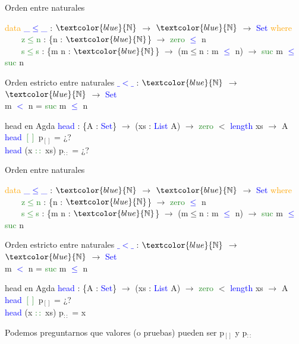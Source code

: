 \documentclass[xcolor=dvipsnames]{beamer} %
\newcommand{\cf}[1]{\textcolor{blue}{#1}}
\newcommand{\ct}[1]{\textcolor{blue}{#1}}
\newcommand{\cc}[1]{\textcolor{ForestGreen}{#1}}
\newcommand{\ck}[1]{\textcolor{orange}{#1}}
\newcommand{\N}{\ct{\mathbb{N}}}
\newcommand{\ra}{\rightarrow}
\begin{document}
\begin{frame}

\begin{block}{Orden entre naturales}

\ck{data} \ct{\_$\leq$\_} : $\N$ $\ra$ $\N$ $\ra$ \ct{Set} \ck{where}\\
\ \ \ \ \cc{z$\leq$n} : \{n : $\N$\}                 $\ra$ \cc{zero}  \ct{$\leq$} n\\
\ \ \ \ \cc{s$\leq$s} : \{m n : $\N$\} $\ra$ (m$\leq$n : m \ct{$\leq$} n) $\ra$ \cc{suc} m \ct{$\leq$} \cc{suc} n

\end{block}

\begin{block}{Orden estricto entre naturales}
\cf{$\_<\_$} : $\N$ $\ra$ $\N$ $\ra$ \ct{Set}\\
m \cf{$<$} n = \cc{suc} m \cf{$\leq$} n
\end{block}

\begin{block}{head en Agda}
    \cf{head} : \{A : \ct{Set}\}  $\ra$ (xs : \ct{List} A) $\ra$ 
    \cc{zero} $<$ \ct{length} xs $\rightarrow$ A \\
    \pause
    \cf{head} \cc{$[]$} p$_{[]}$ = ¿?\\
    \cf{head} (x \cc{$::$} xs) p$_{::}$ = ¿?
  \end{block}  

\end{frame}

\begin{frame}

\begin{block}{Orden entre naturales}

\ck{data} \ct{\_$\leq$\_} : $\N$ $\ra$ $\N$ $\ra$ \ct{Set} \ck{where}\\
\ \ \ \ \cc{z$\leq$n} : \{n : $\N$\}                 $\ra$ \cc{zero}  \ct{$\leq$} n\\
\ \ \ \ \cc{s$\leq$s} : \{m n : $\N$\} $\ra$ (m$\leq$n : m \ct{$\leq$} n) $\ra$ \cc{suc} m \ct{$\leq$} \cc{suc} n

\end{block}

\begin{block}{Orden estricto entre naturales}
\cf{$\_<\_$} : $\N$ $\ra$ $\N$ $\ra$ \ct{Set}\\
m \cf{$<$} n = \cc{suc} m \cf{$\leq$} n
\end{block}

\begin{block}{head en Agda}
    \cf{head} : \{A : \ct{Set}\}  $\ra$ (xs : \ct{List} A) $\ra$ 
    \cc{zero} $<$ \ct{length} xs $\rightarrow$ A \\
    \cf{head} \cc{$[]$} p$_{[]}$ = ¿?\\
    \cf{head} (x \cc{$::$} xs) p$_{::}$ = x
  \end{block}  

\pause

\begin{block}{}
Podemos preguntarnos que valores (o pruebas) pueden ser p$_{[]}$ y p$_{::}$
\end{block}

\end{frame}
\end{document}
